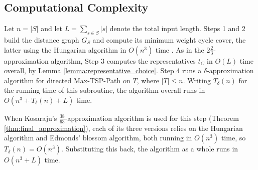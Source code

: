 \subsection{Computational Complexity}
Let $n = |S|$ and let $L = \sum_{s \in S} |s|$ denote the total input length.
Steps 1 and 2 build the distance graph $G_S$ and compute its minimum weight
cycle cover, the latter using the Hungarian algorithm in $O(n^3)$ time
\cite{kuhn1955hungarian, edmondskarp1972, tomizawa1971techniques}. As in the $2\frac{2}{3}$-approximation algorithm, Step
3 computes the representatives $t_C$ in $O(L)$ time overall, by Lemma
\ref{lemma:representative_choice}. Step 4 runs a $\delta$-approximation
algorithm for directed Max-TSP-Path on $T$, where $|T| \le n$. Writing
$T_\delta(n)$ for the running time of this subroutine, the algorithm overall
runs in $O(n^3 + T_\delta(n) + L)$ time.

When Kosaraju's $\frac{38}{63}$-approximation algorithm is used for this step
(Theorem \ref{thm:final_approximation}), each of its three versions relies on
the Hungarian algorithm and Edmonds' blossom algorithm, both running in $O(n^3)$
time, so $T_\delta(n) = O(n^3)$. Substituting this back, the algorithm as a
whole runs in $O(n^3 + L)$ time.
